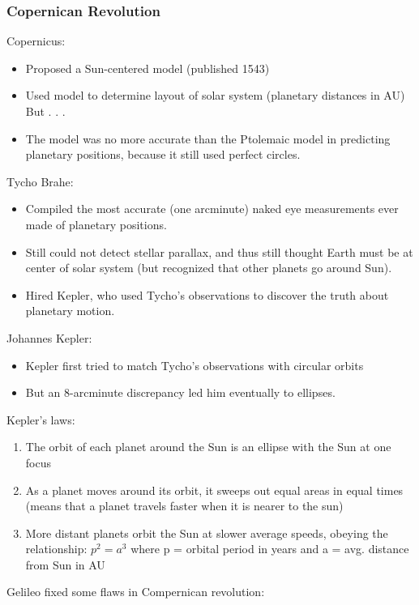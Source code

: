 \documentclass[12pt]{article}
\begin{document}
\subsubsection{Copernican Revolution}
Copernicus:
\begin{itemize}
\item Proposed a Sun-centered model (published 1543)
\item Used model to determine layout of solar system (planetary distances in AU) But . . .
\item The model was no more accurate than the Ptolemaic model in predicting planetary positions, because it still used perfect circles.
\end{itemize}
Tycho Brahe:
\begin{itemize}
\item Compiled the most accurate (one arcminute) naked eye measurements ever made of planetary positions.
\item Still could not detect stellar parallax, and thus still thought Earth must be at center of solar system (but recognized that other planets go around Sun).
\item Hired Kepler, who used Tycho's observations to discover the truth about planetary motion.
\end{itemize}
Johannes Kepler:
\begin{itemize}
\item Kepler first tried to match Tycho's observations with circular orbits
\item But an 8-arcminute discrepancy led him eventually to ellipses.
\end{itemize}
Kepler's laws:
\begin{enumerate}
\item The orbit of each planet around the Sun is an ellipse with the Sun at one focus
\item As a planet moves around its orbit, it sweeps out equal areas in equal times  (means that a planet travels faster when it is nearer to the sun)
\item More distant planets orbit the Sun at slower average speeds, obeying the relationship: $p^2 = a^3$ where p = orbital period in years and a = avg. distance from Sun in AU
\end{enumerate}
Gelileo fixed some flaws in Compernican revolution:
\end{document}
